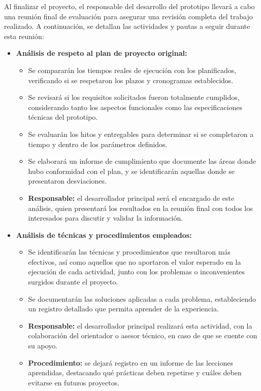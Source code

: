 \documentclass[
11pt, %
]{charter}
\begin{document}


Al finalizar el proyecto, el responsable del desarrollo del prototipo llevará a cabo una reunión final de evaluación para asegurar una revisión completa del trabajo realizado. A continuación, se detallan las actividades y pautas a seguir durante esta reunión:

\begin{itemize}
    \item \textbf{Análisis de respeto al plan de proyecto original:}
    \begin{itemize}
        \item Se compararán los tiempos reales de ejecución con los planificados, verificando si se respetaron los plazos y cronogramas establecidos.
        \item Se revisará si los requisitos solicitados fueron totalmente cumplidos, considerando tanto los aspectos funcionales como las especificaciones técnicas del prototipo.
        \item Se evaluarán los hitos y entregables para determinar si se completaron a tiempo y dentro de los parámetros definidos.
        \item Se elaborará un informe de cumplimiento que documente las áreas donde hubo conformidad con el plan, y se identificarán aquellas donde se presentaron desviaciones.
        \item \textbf{Responsable:} el desarrollador principal será el encargado de este análisis, quien presentará los resultados en la reunión final con todos los interesados para discutir y validar la información.
    \end{itemize}
    
    \item \textbf{Análisis de técnicas y procedimientos empleados:}
    \begin{itemize}
        \item Se identificarán las técnicas y procedimientos que resultaron más efectivos, así como aquellos que no aportaron el valor esperado en la ejecución de cada actividad, junto con los problemas o inconvenientes surgidos durante el proyecto.
        \item Se documentarán las soluciones aplicadas a cada problema, estableciendo un registro detallado que permita aprender de la experiencia.
        \item \textbf{Responsable:} el desarrollador principal realizará esta actividad, con la colaboración del orientador o asesor técnico, en caso de que se cuente con su apoyo.
        \item \textbf{Procedimiento:} se dejará registro en un informe de las lecciones aprendidas, destacando qué prácticas deben repetirse y cuáles deben evitarse en futuros proyectos.
    \end{itemize}
    

\end{itemize}
\end{document}
